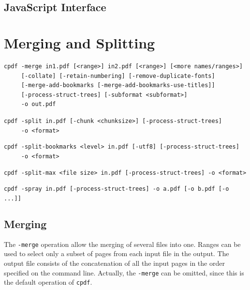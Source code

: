 \documentclass{book}
\newcommand{\cpdf}{\texttt{cpdf}}
\begin{document}
\begin{jscpdflib}
\clearpage
\section*{JavaScript Interface}
\begin{small}\tt




\end{small}
\end{jscpdflib}

\chapter{Merging and Splitting}\label{chap:2}
  \begin{framed}
  \small
  \noindent\begin{verbatim}
cpdf -merge in1.pdf [<range>] in2.pdf [<range>] [<more names/ranges>]
     [-collate] [-retain-numbering] [-remove-duplicate-fonts]
     [-merge-add-bookmarks [-merge-add-bookmarks-use-titles]]
     [-process-struct-trees] [-subformat <subformat>]
     -o out.pdf\end{verbatim}

  \vspace{1.5mm}
  \noindent\verb!cpdf -split in.pdf [-chunk <chunksize>] [-process-struct-trees]!\\
  \noindent\verb!     -o <format>!

  \vspace{1.5mm}
  \noindent\verb!cpdf -split-bookmarks <level> in.pdf [-utf8] [-process-struct-trees]!\\
  \noindent\verb!     -o <format>!

  \vspace{1.5mm}
  \noindent\verb!cpdf -split-max <file size> in.pdf [-process-struct-trees] -o <format>!

  \vspace{1.5mm}
  \noindent\verb!cpdf -spray in.pdf [-process-struct-trees] -o a.pdf [-o b.pdf [-o ...]]!
  \end{framed}

  \vspace{12mm}
  \section{Merging}
  The \texttt{-merge} operation allow the merging of several files into one.
Ranges can be used to select only a subset of pages from each
input file in the output. The output file consists of the concatenation of all
the input pages in the order specified on the command line. Actually, the
\texttt{-merge} can be omitted, since this is the default operation of \cpdf.
\end{document}
